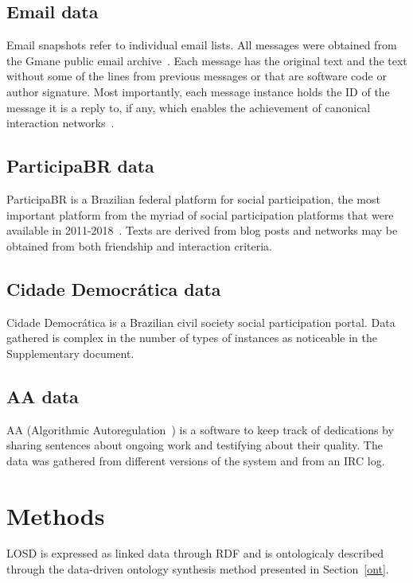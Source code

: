 \documentclass[data,datadescriptor,submit,moreauthors,pdftex]{Definitions/mdpi}
\begin{document}
\subsection{Email data}
Email snapshots refer to individual email lists.
All messages were obtained from the Gmane public email archive~\cite{gmane}.
Each message has the original text and the text without some of the lines
from previous messages or that are software code or author signature.
Most importantly, each message instance holds the ID of the message it is
a reply to, if any, which enables the achievement of canonical interaction networks~\cite{bird,stab}.

\subsection{ParticipaBR data}
ParticipaBR is a Brazilian federal platform for social participation,
the most important platform from the myriad of social participation platforms
that were available in 2011-2018~\cite{spbr}.
Texts are derived from blog posts and networks may be obtained from
both friendship and interaction criteria.

\subsection{Cidade Democrática data}
Cidade Democrática is a Brazilian civil society social participation portal.
Data gathered is complex in the number of types of instances as noticeable in the Supplementary document.

\subsection{AA data}
AA (Algorithmic Autoregulation~\cite{aa,aa2}) is a software to keep track of dedications by sharing sentences about ongoing work and testifying about their quality.
The data was gathered from different versions of the system and from an IRC
log.
 
 
\section{Methods}\label{methods}
LOSD is expressed as linked data through RDF
and is ontologicaly described through the
data-driven ontology synthesis method presented in Section~\ref{ont}.
\end{document}
